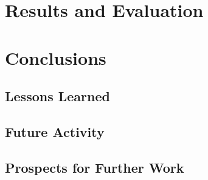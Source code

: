 

\chapter{Results and Evaluation}



\chapter{Conclusions}
\section{Lessons Learned}
\section{Future Activity}
\section{Prospects for Further Work}
